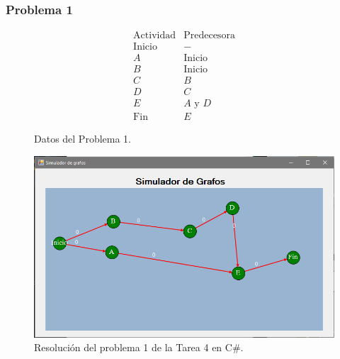 \documentclass[a4paper, 12pt]{article}
\begin{document}
    \subsubsection{Problema 1}
    \begin{figure}[H]
        \[\begin{matrix}
            \text{Actividad}&\text{Predecesora}\\
            \text{Inicio}&-\\
            A&\text{Inicio}\\
            B&\text{Inicio}\\
            C&B\\
            D&C\\
            E&A\text{ y }D\\
            \text{Fin}&E
        \end{matrix}\]
        \caption{Datos del Problema 1.}
    \end{figure}
    \begin{figure}[H]
        \centering
        \includegraphics[width=12cm]{tarea4p1.PNG}
        \caption{Resolución del problema 1 de la Tarea 4 en C\#.}
    \end{figure}
\end{document}
